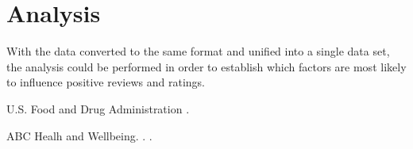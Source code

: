 \documentclass[11pt]{article}
\begin{document}
\section{Analysis}

With the data converted to the same format and unified into a single data set, the analysis could be performed in order to establish which factors are most likely to influence positive reviews and ratings.






\begin{thebibliography}{}

{U.S. Food and Drug Administration}
.

{ABC Healh and Wellbeing}.
.
.

\end{thebibliography}
\end{document}

